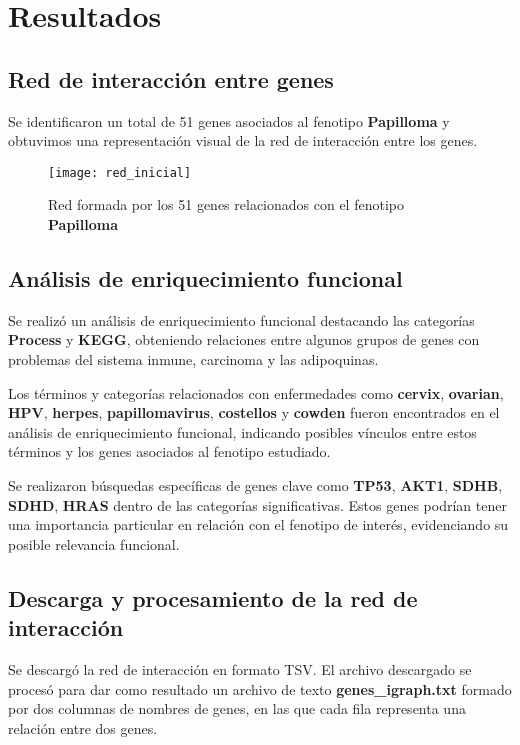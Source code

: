 
\section{Resultados}

\subsection{Red de interacción entre genes}

Se identificaron un total de 51 genes asociados al fenotipo \textbf{Papilloma} y obtuvimos una representación visual de la red de interacción entre los genes.
\begin{figure}
	\centering
	\texttt{[image: red\_inicial]}
	\caption{Red formada por los 51 genes relacionados con el fenotipo \textbf{Papilloma}}
	\label{fig:grado_centralidad}
\end{figure}

\subsection{Análisis de enriquecimiento funcional}

Se realizó un análisis de enriquecimiento funcional destacando las categorías \textbf{Process} y \textbf{KEGG}, obteniendo relaciones entre algunos grupos de genes con problemas del sistema inmune, carcinoma y las adipoquinas.

Los términos y categorías relacionados con enfermedades como \textbf{cervix}, \textbf{ovarian}, \textbf{HPV}, \textbf{herpes}, \textbf{papillomavirus}, \textbf{costellos} y \textbf{cowden} fueron encontrados en el análisis de enriquecimiento funcional, indicando posibles vínculos entre estos términos y los genes asociados al fenotipo estudiado.

Se realizaron búsquedas específicas de genes clave como \textbf{TP53}, \textbf{AKT1}, \textbf{SDHB}, \textbf{SDHD}, \textbf{HRAS} dentro de las categorías significativas. Estos genes podrían tener una importancia particular en relación con el fenotipo de interés, evidenciando su posible relevancia funcional.

\subsection{Descarga y procesamiento de la red de interacción}

Se descargó la red de interacción en formato TSV. El archivo descargado se procesó para dar como resultado un archivo de texto \textbf{genes_igraph.txt} formado por dos columnas de nombres de genes, en las que cada fila representa una relación entre dos genes.



